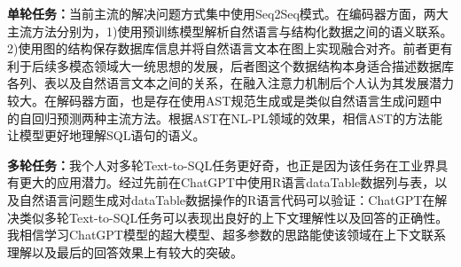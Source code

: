 \documentclass[lang=cn,a4paper,newtx]{elegantpaper}
\begin{document}
    \textbf{单轮任务：}当前主流的解决问题方式集中使用Seq2Seq模式。在编码器方面，两大主流方法分别为，1)使用预训练模型解析自然语言与结构化数据之间的语义联系。2)使用图的结构保存数据库信息并将自然语言文本在图上实现融合对齐。前者更有利于后续多模态领域大一统思想的发展，后者图这个数据结构本身适合描述数据库各列、表以及自然语言文本之间的关系，在融入注意力机制后个人认为其发展潜力较大。在解码器方面，也是存在使用AST规范生成或是类似自然语言生成问题中的自回归预测两种主流方法。根据AST在NL-PL领域的效果，相信AST的方法能让模型更好地理解SQL语句的语义。
    
    \textbf{多轮任务：}我个人对多轮Text-to-SQL任务更好奇，也正是因为该任务在工业界具有更大的应用潜力。经过先前在ChatGPT中使用R语言dataTable数据列与表，以及自然语言问题生成对dataTable数据操作的R语言代码可以验证：ChatGPT在解决类似多轮Text-to-SQL任务可以表现出良好的上下文理解性以及回答的正确性。我相信学习ChatGPT模型的超大模型、超多参数的思路能使该领域在上下文联系理解以及最后的回答效果上有较大的突破。
    

    

    
\end{document}

